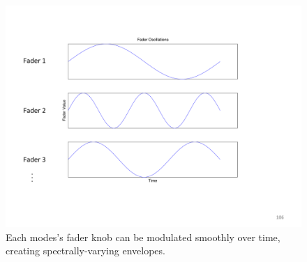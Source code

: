 \begin{figure}
	\centering
	\includegraphics[width=\textwidth]{chap6/figures/fader_envelopes.png}
	\caption{Each modes's fader knob can be modulated smoothly over time, creating spectrally-varying envelopes.}
\label{fig:fader_envs}
\end{figure}



